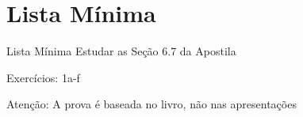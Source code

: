 \documentclass[fleqn,utf8,aspectratio=169,12pt]{beamer}
\begin{document}
\section{Lista Mínima}

\begin{frame}{Lista Mínima}
  Estudar as Seção 6.7 da Apostila

  \vspace{\baselineskip}
  Exercícios: 1a-f

  \vfill
  Atenção: A prova é baseada no livro, não nas apresentações
\end{frame}

\end{document}
